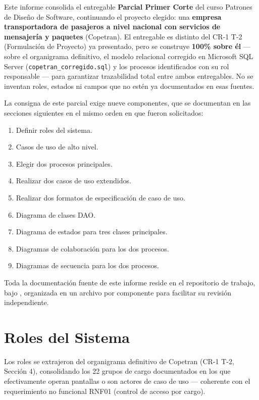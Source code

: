 \documentclass[11pt,a4paper]{article}
\begin{document}
Este informe consolida el entregable \textbf{Parcial Primer Corte} del curso Patrones de Diseño
de Software, continuando el proyecto elegido: una \textbf{empresa transportadora de pasajeros a
nivel nacional con servicios de mensajería y paquetes} (Copetran). El entregable es distinto del
CR-1 T-2 (Formulación de Proyecto) ya presentado, pero se construye \textbf{100\% sobre él} ---
sobre el organigrama definitivo, el modelo relacional corregido en Microsoft SQL Server
(\texttt{copetran_corregido.sql}) y los procesos identificados con su rol responsable --- para
garantizar trazabilidad total entre ambos entregables. No se inventan roles, estados ni campos que
no estén ya documentados en esas fuentes.

La consigna de este parcial exige nueve componentes, que se documentan en las secciones
siguientes en el mismo orden en que fueron solicitados:

\begin{enumerate}[nosep]
  \item Definir roles del sistema.
  \item Casos de uso de alto nivel.
  \item Elegir dos procesos principales.
  \item Realizar dos casos de uso extendidos.
  \item Realizar dos formatos de especificación de caso de uso.
  \item Diagrama de clases DAO.
  \item Diagrama de estados para tres clases principales.
  \item Diagramas de colaboración para los dos procesos.
  \item Diagramas de secuencia para los dos procesos.
\end{enumerate}

Toda la documentación fuente de este informe reside en el repositorio de trabajo, bajo
, organizada en un archivo por componente para facilitar su
revisión independiente.

\section{Roles del Sistema}

Los roles se extrajeron del organigrama definitivo de Copetran (CR-1 T-2, Sección 4), consolidando
los 22 grupos de cargo documentados en los que efectivamente operan pantallas o son actores de
caso de uso --- coherente con el requerimiento no funcional RNF01 (control de acceso por cargo).
\end{document}
